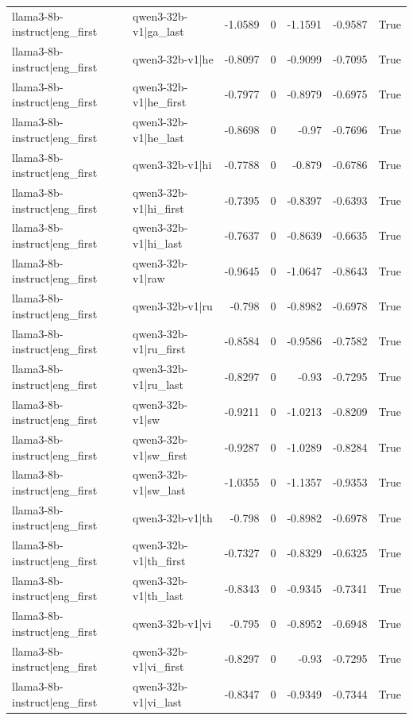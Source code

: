 \begin{table}
\begin{tabular}{l l r r r r l}
llama3-8b-instruct|eng_first & qwen3-32b-v1|ga_last & -1.0589 & 0 & -1.1591 & -0.9587 & True \\
llama3-8b-instruct|eng_first & qwen3-32b-v1|he & -0.8097 & 0 & -0.9099 & -0.7095 & True \\
llama3-8b-instruct|eng_first & qwen3-32b-v1|he_first & -0.7977 & 0 & -0.8979 & -0.6975 & True \\
llama3-8b-instruct|eng_first & qwen3-32b-v1|he_last & -0.8698 & 0 & -0.97 & -0.7696 & True \\
llama3-8b-instruct|eng_first & qwen3-32b-v1|hi & -0.7788 & 0 & -0.879 & -0.6786 & True \\
llama3-8b-instruct|eng_first & qwen3-32b-v1|hi_first & -0.7395 & 0 & -0.8397 & -0.6393 & True \\
llama3-8b-instruct|eng_first & qwen3-32b-v1|hi_last & -0.7637 & 0 & -0.8639 & -0.6635 & True \\
llama3-8b-instruct|eng_first & qwen3-32b-v1|raw & -0.9645 & 0 & -1.0647 & -0.8643 & True \\
llama3-8b-instruct|eng_first & qwen3-32b-v1|ru & -0.798 & 0 & -0.8982 & -0.6978 & True \\
llama3-8b-instruct|eng_first & qwen3-32b-v1|ru_first & -0.8584 & 0 & -0.9586 & -0.7582 & True \\
llama3-8b-instruct|eng_first & qwen3-32b-v1|ru_last & -0.8297 & 0 & -0.93 & -0.7295 & True \\
llama3-8b-instruct|eng_first & qwen3-32b-v1|sw & -0.9211 & 0 & -1.0213 & -0.8209 & True \\
llama3-8b-instruct|eng_first & qwen3-32b-v1|sw_first & -0.9287 & 0 & -1.0289 & -0.8284 & True \\
llama3-8b-instruct|eng_first & qwen3-32b-v1|sw_last & -1.0355 & 0 & -1.1357 & -0.9353 & True \\
llama3-8b-instruct|eng_first & qwen3-32b-v1|th & -0.798 & 0 & -0.8982 & -0.6978 & True \\
llama3-8b-instruct|eng_first & qwen3-32b-v1|th_first & -0.7327 & 0 & -0.8329 & -0.6325 & True \\
llama3-8b-instruct|eng_first & qwen3-32b-v1|th_last & -0.8343 & 0 & -0.9345 & -0.7341 & True \\
llama3-8b-instruct|eng_first & qwen3-32b-v1|vi & -0.795 & 0 & -0.8952 & -0.6948 & True \\
llama3-8b-instruct|eng_first & qwen3-32b-v1|vi_first & -0.8297 & 0 & -0.93 & -0.7295 & True \\
llama3-8b-instruct|eng_first & qwen3-32b-v1|vi_last & -0.8347 & 0 & -0.9349 & -0.7344 & True \\

\end{tabular}
\end{table}
